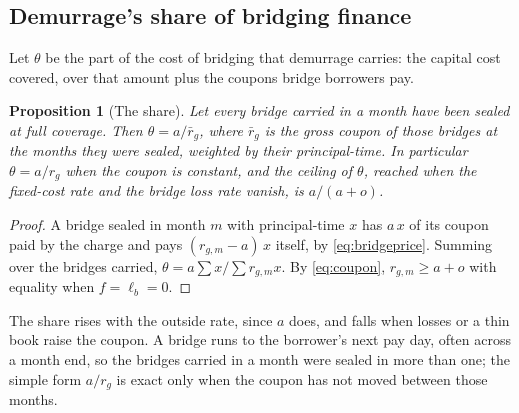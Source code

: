 \documentclass[10pt,a4paper]{article}
\newtheorem{proposition}{Proposition}
\theoremstyle{remark}
\begin{document}
\subsection{Demurrage's share of bridging finance}
Let \(\theta\) be the part of the cost of bridging that demurrage carries:
the capital cost covered, over that amount plus the coupons bridge borrowers
pay.
\begin{proposition}[The share]
\label{prop:theta}
Let every bridge carried in a month have been sealed at full coverage. Then
\(\theta=a/\bar r_g\), where \(\bar r_g\) is the gross coupon of those
bridges at the months they were sealed, weighted by their principal-time. In
particular \(\theta=a/r_g\) when the coupon is constant, and the ceiling of
\(\theta\), reached when the fixed-cost rate and the bridge loss rate vanish,
is \(a/(a+o)\).
\end{proposition}
\begin{proof}
A bridge sealed in month \(m\) with principal-time \(x\) has \(a\,x\) of its
coupon paid by the charge and pays \((r_{g,m}-a)\,x\) itself, by
\eqref{eq:bridgeprice}. Summing over the bridges carried,
\(\theta=a\sum x/\sum r_{g,m}x\). By \eqref{eq:coupon}, \(r_{g,m}\ge a+o\)
with equality when \(f=\ell_b=0\).
\end{proof}
The share rises with the outside rate, since \(a\) does, and falls when
losses or a thin book raise the coupon. A bridge runs to the borrower's next
pay day, often across a month end, so the bridges carried in a month were
sealed in more than one; the simple form \(a/r_g\) is exact only when the
coupon has not moved between those months.
\end{document}
